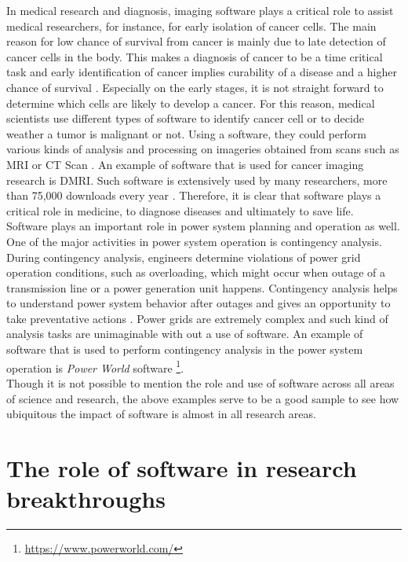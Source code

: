 In medical research and diagnosis, imaging software plays a critical role to assist medical researchers, for instance, for early isolation of cancer cells.  The main reason for low chance of survival from cancer is mainly due to late detection of cancer cells in the body. This makes a diagnosis of cancer to be a time critical task and early identification of cancer implies curability of a disease and a higher chance of survival \citep{wagner2004challenges}. Especially on the early stages, it is not straight forward to determine which cells are likely to develop a cancer. For this reason, medical scientists use different types of software to identify cancer cell or to decide weather a tumor is malignant or not. Using a software, they could perform various kinds of analysis and processing on imageries obtained from scans such as \ac{MRI} or \ac{CT} Scan \citep{al2012lung}. An example of software that is used for cancer imaging research is \ac{DMRI}. Such software is extensively used by many researchers, more than 75,000 downloads every year \citep{norton2017slicerdmri}. Therefore, it is clear that software plays a critical role in medicine, to diagnose diseases and ultimately to save life. \\


Software plays an important role in power system planning and operation as well. One of the major activities in power system operation is contingency analysis. During contingency analysis, engineers determine violations of power grid operation conditions, such as overloading, which might occur when outage of a transmission line or a power generation unit happens. Contingency analysis helps to understand power system behavior after outages and gives an opportunity to take preventative actions \citep{mishra2012contingency}. Power grids are extremely complex and such kind of analysis tasks are unimaginable with out a use of software. An example of software that is used to perform contingency analysis in the power system operation is \emph{Power World} software  \footnote{\url{https://www.powerworld.com/}}. \\

Though it is not possible to mention the role and use of software across all areas of science and research, the above examples serve to be a good sample to see how ubiquitous the impact of software is  almost in all research areas. 


%

\section{The role of software in research breakthroughs }
\label{sec:Roles:breakthroughs}

